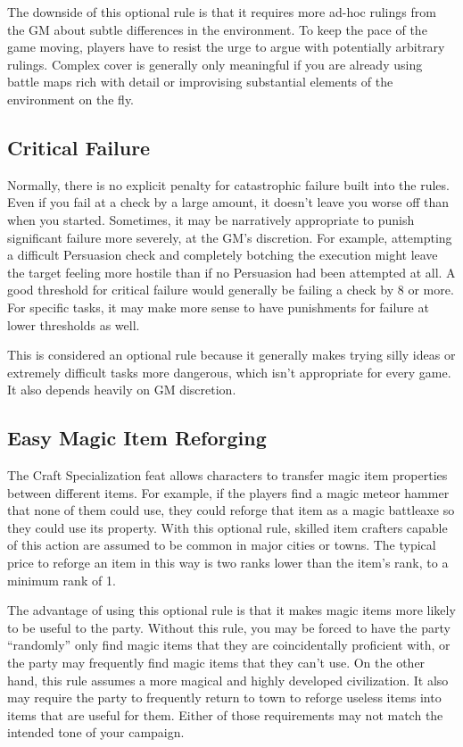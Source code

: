     The downside of this optional rule is that it requires more ad-hoc rulings from the GM about subtle differences in the environment.
    To keep the pace of the game moving, players have to resist the urge to argue with potentially arbitrary rulings.
    Complex cover is generally only meaningful if you are already using battle maps rich with detail or improvising substantial elements of the environment on the fly.

  \subsection{Critical Failure}
    Normally, there is no explicit penalty for catastrophic failure built into the rules.
    Even if you fail at a check by a large amount, it doesn't leave you worse off than when you started.
    Sometimes, it may be narratively appropriate to punish significant failure more severely, at the GM's discretion.
    For example, attempting a difficult Persuasion check and completely botching the execution might leave the target feeling more hostile than if no Persuasion had been attempted at all.
    A good threshold for critical failure would generally be failing a check by 8 or more.
    For specific tasks, it may make more sense to have punishments for failure at lower thresholds as well.

    This is considered an optional rule because it generally makes trying silly ideas or extremely difficult tasks more dangerous, which isn't appropriate for every game.
    It also depends heavily on GM discretion.

  \subsection{Easy Magic Item Reforging}
    The Craft Specialization feat allows characters to transfer magic item properties between different items.
    For example, if the players find a magic meteor hammer that none of them could use, they could reforge that item as a magic battleaxe so they could use its property.
    With this optional rule, skilled item crafters capable of this action are assumed to be common in major cities or towns.
    The typical price to reforge an item in this way is two ranks lower than the item's rank, to a minimum rank of 1.

    The advantage of using this optional rule is that it makes magic items more likely to be useful to the party.
    Without this rule, you may be forced to have the party ``randomly'' only find magic items that they are coincidentally proficient with, or the party may frequently find magic items that they can't use.
    On the other hand, this rule assumes a more magical and highly developed civilization.
    It also may require the party to frequently return to town to reforge useless items into items that are useful for them.
    Either of those requirements may not match the intended tone of your campaign.

